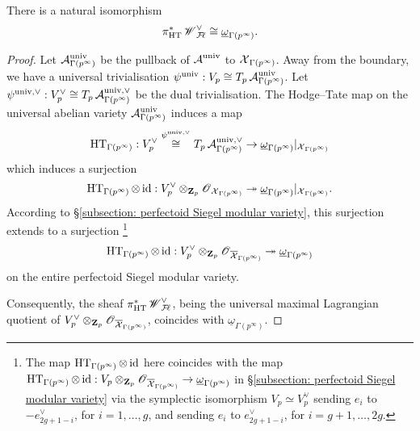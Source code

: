 \begin{Proposition}\label{Proposition: fake Hasse invariants and the coherent automorphic sheaf}
There is a natural isomorphism
$$\pi_{\operatorname{HT}}^*\operatorname{\mathscr{W}}_{\operatorname{\mathcal{F}\!\mathbf{\ell}}}^{\vee}\cong \underline{\omega}_{\Gamma(p^{\infty})}.$$
\end{Proposition}
\begin{proof}
Let $\operatorname{\mathcal{A}}^{\operatorname{univ}}_{\Gamma(p^{\infty})}$ be the pullback of $\operatorname{\mathcal{A}}^{\operatorname{univ}}$ to $\operatorname{\mathcal{X}}_{\Gamma(p^{\infty})}$. Away from the boundary, we have a universal trivialisation $\psi^{\operatorname{univ}}:V_p\cong T_p\operatorname{\mathcal{A}}^{\operatorname{univ}}_{\Gamma(p^{\infty})}$. Let $\psi^{\operatorname{univ}, \vee}:V_p^{\vee}\cong T_p\operatorname{\mathcal{A}}^{\operatorname{univ}, \vee}_{\Gamma(p^{\infty})}$ be the dual trivialisation. The Hodge--Tate map on the universal abelian variety $\operatorname{\mathcal{A}}^{\operatorname{univ}}_{\Gamma(p^{\infty})}$ induces a map
$$\operatorname{HT}_{\Gamma(p^{\infty})}:V_p^{\vee}\overset{\psi^{\operatorname{univ},\vee}}{\cong} T_p\operatorname{\mathcal{A}}^{\operatorname{univ}, \vee}_{\Gamma(p^{\infty})}\rightarrow \underline{\omega}_{\Gamma(p^{\infty})}|_{\operatorname{\mathcal{X}}_{\Gamma(p^{\infty})}}$$
which induces a surjection
$$\operatorname{HT}_{\Gamma(p^{\infty})}\otimes \operatorname{id}:V_p^{\vee}\otimes_{\operatorname{\mathbf{Z}}_p}\operatorname{\mathscr{O}}_{\operatorname{\mathcal{X}}_{\Gamma(p^{\infty})}}\twoheadrightarrow \underline{\omega}_{\Gamma(p^{\infty})}|_{\operatorname{\mathcal{X}}_{\Gamma(p^{\infty})}}.$$
According to \S \ref{subsection: perfectoid Siegel modular variety},
this surjection extends to a surjection \footnote{The map $\operatorname{HT}_{\Gamma(p^{\infty})}\otimes \operatorname{id}$ here coincides with the map $\operatorname{HT}_{\Gamma(p^{\infty})}\otimes \operatorname{id}:V_p\otimes_{\operatorname{\mathbf{Z}}_p}\operatorname{\mathscr{O}}_{\overline{\operatorname{\mathcal{X}}}_{\Gamma(p^{\infty})}}\rightarrow \underline{\omega}_{\Gamma(p^{\infty})}$ in \S \ref{subsection: perfectoid Siegel modular variety} via the symplectic isomorphism $V_p\simeq V_p^{\vee}$ sending $e_i$ to $-e_{2g+1-i}^{\vee}$, for $i=1, \ldots, g$, and sending $e_i$ to $e_{2g+1-i}^{\vee}$, for $i=g+1, \ldots, 2g$.}
$$\operatorname{HT}_{\Gamma(p^{\infty})}\otimes \operatorname{id}:V_p^{\vee}\otimes_{\operatorname{\mathbf{Z}}_p}\operatorname{\mathscr{O}}_{\overline{\operatorname{\mathcal{X}}}_{\Gamma(p^{\infty})}}\twoheadrightarrow \underline{\omega}_{\Gamma(p^{\infty})}$$
on the entire perfectoid Siegel modular variety.

Consequently, the sheaf $\pi_{\operatorname{HT}}^* \operatorname{\mathscr{W}}_{\operatorname{\mathcal{F}\!\mathbf{\ell}}}^{\vee}$, being the universal maximal Lagrangian quotient of $V_p^{\vee}\otimes_{\operatorname{\mathbf{Z}}_p} \operatorname{\mathscr{O}}_{\overline{\operatorname{\mathcal{X}}}_{\Gamma(p^{\infty})}}$, coincides with $\underline{\omega}_{\Gamma(p^{\infty})}$.
\end{proof}

